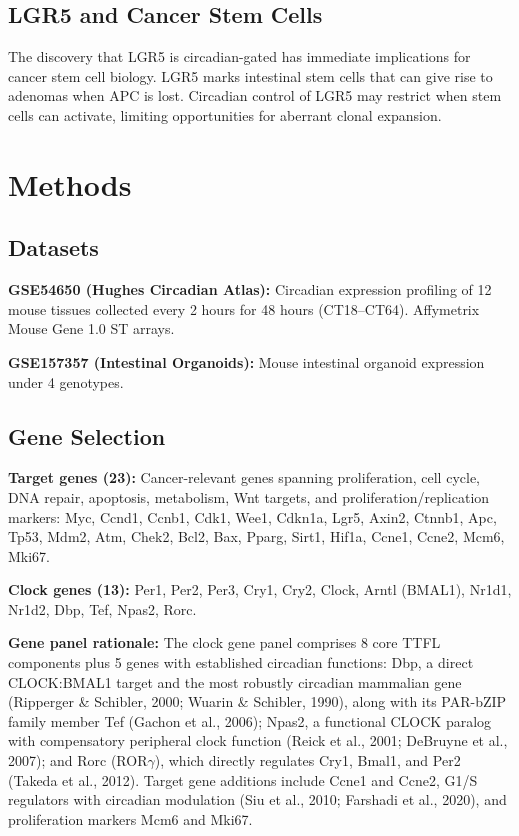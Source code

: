 \documentclass[11pt,letterpaper]{article}
\begin{document}
\subsection{LGR5 and Cancer Stem Cells}

The discovery that LGR5 is circadian-gated has immediate implications for cancer stem cell biology. LGR5 marks intestinal stem cells that can give rise to adenomas when APC is lost. Circadian control of LGR5 may restrict when stem cells can activate, limiting opportunities for aberrant clonal expansion.

\section{Methods}

\subsection{Datasets}

\textbf{GSE54650 (Hughes Circadian Atlas):} Circadian expression profiling of 12 mouse tissues collected every 2 hours for 48 hours (CT18--CT64). Affymetrix Mouse Gene 1.0 ST arrays.

\textbf{GSE157357 (Intestinal Organoids):} Mouse intestinal organoid expression under 4 genotypes.

\subsection{Gene Selection}

\textbf{Target genes (23):} Cancer-relevant genes spanning proliferation, cell cycle, DNA repair, apoptosis, metabolism, Wnt targets, and proliferation/replication markers: Myc, Ccnd1, Ccnb1, Cdk1, Wee1, Cdkn1a, Lgr5, Axin2, Ctnnb1, Apc, Tp53, Mdm2, Atm, Chek2, Bcl2, Bax, Pparg, Sirt1, Hif1a, Ccne1, Ccne2, Mcm6, Mki67.

\textbf{Clock genes (13):} Per1, Per2, Per3, Cry1, Cry2, Clock, Arntl (BMAL1), Nr1d1, Nr1d2, Dbp, Tef, Npas2, Rorc.

\textbf{Gene panel rationale:} The clock gene panel comprises 8 core TTFL components plus 5 genes with established circadian functions: Dbp, a direct CLOCK:BMAL1 target and the most robustly circadian mammalian gene (Ripperger \& Schibler, 2000; Wuarin \& Schibler, 1990), along with its PAR-bZIP family member Tef (Gachon et al., 2006); Npas2, a functional CLOCK paralog with compensatory peripheral clock function (Reick et al., 2001; DeBruyne et al., 2007); and Rorc (ROR$\gamma$), which directly regulates Cry1, Bmal1, and Per2 (Takeda et al., 2012). Target gene additions include Ccne1 and Ccne2, G1/S regulators with circadian modulation (Siu et al., 2010; Farshadi et al., 2020), and proliferation markers Mcm6 and Mki67.
\end{document}
